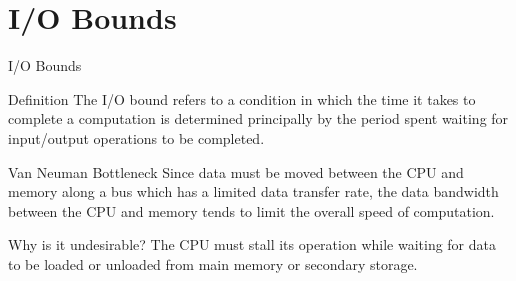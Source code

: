 \documentclass{beamer}
\begin{document}
\section{I/O Bounds}

\begin{frame}{I/O Bounds}

  \begin{block}{Definition}
    The I/O bound refers to a condition in which the time it takes to complete a computation is determined principally by the period spent waiting for input/output operations to be completed.
  \end{block}

  \begin{block}{Van Neuman Bottleneck}
    Since data must be moved between the CPU and memory along a bus which has a limited data transfer rate, the data bandwidth between the CPU and memory tends to limit the overall speed of computation.
  \end{block}

  \begin{block}{Why is it undesirable?}
    The CPU must stall its operation while waiting for data to be loaded or unloaded from main memory or secondary storage.
  \end{block}
  
\end{frame}
\end{document}

